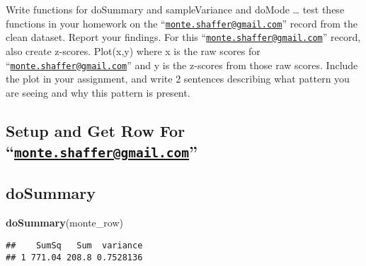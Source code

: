 \documentclass[
]{article}
\newenvironment{Shaded}{\begin{snugshade}}{\end{snugshade}}
\newcommand{\DataTypeTok}[1]{\textcolor[rgb]{0.13,0.29,0.53}{#1}}
\newcommand{\KeywordTok}[1]{\textcolor[rgb]{0.13,0.29,0.53}{\textbf{#1}}}
\newcommand{\NormalTok}[1]{#1}
\newcommand{\OperatorTok}[1]{\textcolor[rgb]{0.81,0.36,0.00}{\textbf{#1}}}
\newcommand{\StringTok}[1]{\textcolor[rgb]{0.31,0.60,0.02}{#1}}
\begin{document}
Write functions for doSummary and sampleVariance and doMode \ldots{}
test these functions in your homework on the
``\href{mailto:monte.shaffer@gmail.com}{\nolinkurl{monte.shaffer@gmail.com}}''
record from the clean dataset. Report your findings. For this
``\href{mailto:monte.shaffer@gmail.com}{\nolinkurl{monte.shaffer@gmail.com}}''
record, also create z-scores. Plot(x,y) where x is the raw scores for
``\href{mailto:monte.shaffer@gmail.com}{\nolinkurl{monte.shaffer@gmail.com}}''
and y is the z-scores from those raw scores. Include the plot in your
assignment, and write 2 sentences describing what pattern you are seeing
and why this pattern is present.

\hypertarget{setup-and-get-row-for-monte.shaffergmail.com}{%
\subsection{\texorpdfstring{Setup and Get Row For
``\href{mailto:monte.shaffer@gmail.com}{\nolinkurl{monte.shaffer@gmail.com}}''}{Setup and Get Row For ``monte.shaffer@gmail.com''}}\label{setup-and-get-row-for-monte.shaffergmail.com}}

\begin{Shaded}
\end{Shaded}

\hypertarget{dosummary}{%
\subsection{doSummary}\label{dosummary}}

\begin{Shaded}
\begin{Highlighting}[]
\KeywordTok{doSummary}\NormalTok{(monte_row)}
\end{Highlighting}
\end{Shaded}

\begin{verbatim}
##    SumSq   Sum  variance
## 1 771.04 208.8 0.7528136
\end{verbatim}
\end{document}
